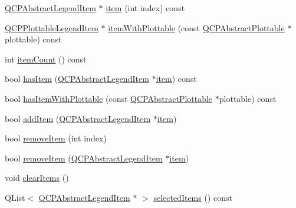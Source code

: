 \begin{DoxyCompactItemize}
\item 
\hyperlink{classQCPAbstractLegendItem}{\-Q\-C\-P\-Abstract\-Legend\-Item} $\ast$ \hyperlink{classQCPLegend_a454272d7094437beb3278a2294006da5}{item} (int index) const 
\item 
\hyperlink{classQCPPlottableLegendItem}{\-Q\-C\-P\-Plottable\-Legend\-Item} $\ast$ \hyperlink{classQCPLegend_a5ee80cf83f65e3b6dd386942ee3cc1ee}{item\-With\-Plottable} (const \hyperlink{classQCPAbstractPlottable}{\-Q\-C\-P\-Abstract\-Plottable} $\ast$plottable) const 
\item 
int \hyperlink{classQCPLegend_a198228e9cdc78d3a3c306fa6763d0404}{item\-Count} () const 
\item 
bool \hyperlink{classQCPLegend_a380dd19eb631592e1ebb9b24cc5b398a}{has\-Item} (\hyperlink{classQCPAbstractLegendItem}{\-Q\-C\-P\-Abstract\-Legend\-Item} $\ast$\hyperlink{classQCPLegend_a454272d7094437beb3278a2294006da5}{item}) const 
\item 
bool \hyperlink{classQCPLegend_a2eb1d24bdf5658e64962a656303fd61a}{has\-Item\-With\-Plottable} (const \hyperlink{classQCPAbstractPlottable}{\-Q\-C\-P\-Abstract\-Plottable} $\ast$plottable) const 
\item 
bool \hyperlink{classQCPLegend_a3ab274de52d2951faea45a6d975e6b3f}{add\-Item} (\hyperlink{classQCPAbstractLegendItem}{\-Q\-C\-P\-Abstract\-Legend\-Item} $\ast$\hyperlink{classQCPLegend_a454272d7094437beb3278a2294006da5}{item})
\item 
bool \hyperlink{classQCPLegend_ac91595c3eaa746fe6321d2eb952c63bb}{remove\-Item} (int index)
\item 
bool \hyperlink{classQCPLegend_a2aea4ec6da2d454dd0b241a254d65082}{remove\-Item} (\hyperlink{classQCPAbstractLegendItem}{\-Q\-C\-P\-Abstract\-Legend\-Item} $\ast$\hyperlink{classQCPLegend_a454272d7094437beb3278a2294006da5}{item})
\item 
void \hyperlink{classQCPLegend_a24795c7250eb5214fcea16b7217b4dfb}{clear\-Items} ()
\item 
\-Q\-List$<$ \hyperlink{classQCPAbstractLegendItem}{\-Q\-C\-P\-Abstract\-Legend\-Item} $\ast$ $>$ \hyperlink{classQCPLegend_ac93eaf236e911d67aa8b88942ef45c5e}{selected\-Items} () const 
\end{DoxyCompactItemize}
